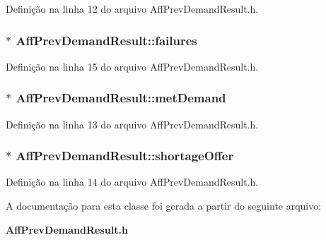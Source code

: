 Definição na linha 12 do arquivo Aff\+Prev\+Demand\+Result.\+h.

\subsubsection[{failures}]{$\ast$ Aff\+Prev\+Demand\+Result\+::failures}\label{class_aff_prev_demand_result_ad507120e8493f37b5a67a4ef25194172}


Definição na linha 15 do arquivo Aff\+Prev\+Demand\+Result.\+h.

\subsubsection[{met\+Demand}]{$\ast$ Aff\+Prev\+Demand\+Result\+::met\+Demand}\label{class_aff_prev_demand_result_ad588d8f7dd79106437b485cf79d0021c}


Definição na linha 13 do arquivo Aff\+Prev\+Demand\+Result.\+h.

\subsubsection[{shortage\+Offer}]{$\ast$ Aff\+Prev\+Demand\+Result\+::shortage\+Offer}\label{class_aff_prev_demand_result_a86a388f066799b947a1a485afcc59f05}


Definição na linha 14 do arquivo Aff\+Prev\+Demand\+Result.\+h.



A documentação para esta classe foi gerada a partir do seguinte arquivo\+:\begin{DoxyCompactItemize}
\item 
{\bf Aff\+Prev\+Demand\+Result.\+h}\end{DoxyCompactItemize}
